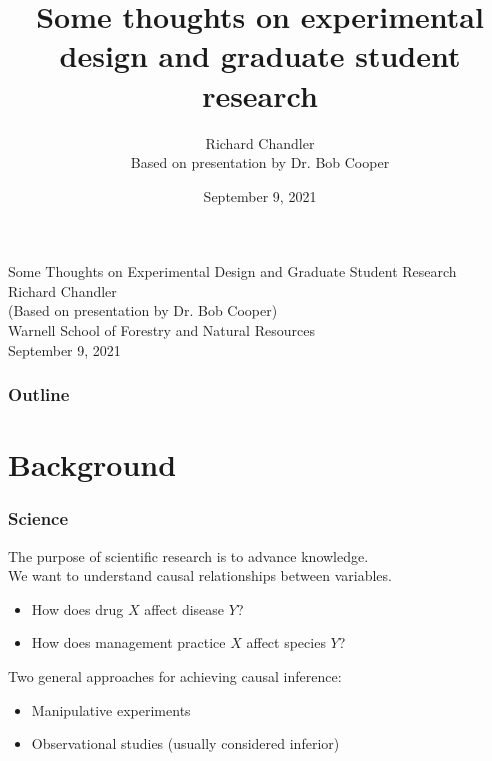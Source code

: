 \documentclass[color=usenames,dvipsnames]{beamer}\usepackage[]{graphicx}\usepackage[]{color}
\title[slides]{Some thoughts on experimental design and
  graduate student research}
\author{Richard Chandler \\ Based on presentation by Dr. Bob Cooper}
\date{September 9, 2021}
\begin{document}
\begin{frame}[plain]
  \centering
  \LARGE
  Some Thoughts on Experimental Design and Graduate Student Research \\
  \vfill
  \large
  Richard Chandler \\
  (Based on presentation by Dr. Bob Cooper) \\
  Warnell School of Forestry and Natural Resources \\
  September 9, 2021
\end{frame}



\begin{frame}
  \frametitle{Outline}
  \Large
  \tableofcontents%
\end{frame}


\section{Background}


\begin{frame}
  \frametitle{Science}
  The purpose of scientific research is to advance knowledge. \\
  \pause
  \vfill
  We want to understand causal relationships between variables. \\
  \begin{itemize}
    \item How does drug $X$ affect disease $Y$?
    \item How does management practice $X$ affect species $Y$?
  \end{itemize}
  \pause
  \vfill
  Two general approaches for achieving causal inference:
  \begin{itemize}
    \item Manipulative experiments
    \item Observational studies (usually considered inferior)
  \end{itemize}
\end{frame}
\end{document}
